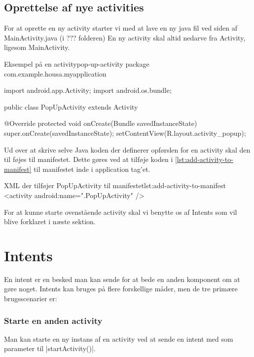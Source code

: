 \subsection{Oprettelse af nye activities}

For at oprette en ny activity starter vi med at lave en ny java fil ved siden af MainActivity.java (i ??? folderen) En ny activity skal altid nedarve fra Activity, ligesom MainActivity. 

\begin{JavaCode}{Eksempel på en activity}{pop-up-activity}
	package com.example.housa.myapplication
	
	import android.app.Activity;
	import android.os.bundle;
	
	public class PopUpActivity extends Activity {
 
 @Override
 protected void onCreate(Bundle savedInstanceState) {
  super.onCreate(savedInstanceState);
  setContentView(R.layout.activity_popup);
 }
	}
\end{JavaCode}

Ud over at skrive selve Java koden der definerer opførslen for en activity skal den til føjes til manifestet. Dette gøres ved at tilføje koden i \autoref{lst:add-activity-to-manifest} til manifestet inde i application tag'et.

\begin{XmlCode}{XML der tilføjer PopUpActivity til manifestet}{lst:add-activity-to-manifest}
	<activity android:name=".PopUpActivity" />
\end{XmlCode}

For at kunne starte ovenstående activity skal vi benytte os af Intents som vil blive forklaret i næste sektion.


\section{Intents}

En intent er en besked man kan sende for at bede en anden komponent om at gøre noget. Intents kan bruges på flere forskellige måder, men de tre primære brugsscenarier er:

\subsubsection{Starte en anden activity}

Man kan starte en ny instans af en activity ved at sende en intent med som parameter til \JavaInline|startActivity()|. 

